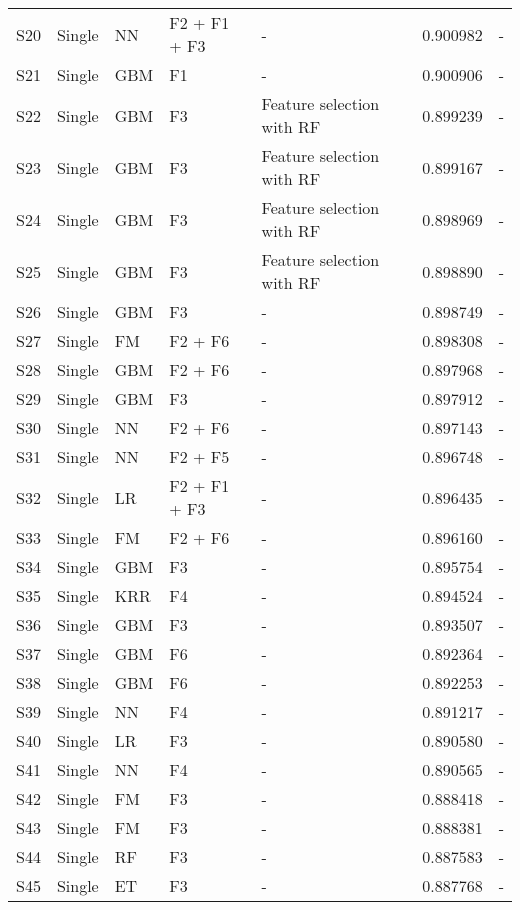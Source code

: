 \begin{table*}[t]
\begin{center}
\begin{minipage}{\textwidth}
{\begin{tabular}{lllllll}
S20 	& Single	& NN		& F2 + F1 + F3 			& - 						& 0.900982	& - \\
S21	& Single 	& GBM		& F1					& - 						& 0.900906	& - \\
S22	& Single	& GBM		& F3					& Feature selection with RF	& 0.899239	& - \\
S23	& Single	& GBM		& F3					& Feature selection with RF	& 0.899167	& - \\
S24	& Single	& GBM		& F3					& Feature selection with RF	& 0.898969	& - \\
S25 	& Single	& GBM		& F3					& Feature selection with RF	& 0.898890	& - \\
S26 	& Single	& GBM		& F3					& - 						& 0.898749	& - \\
S27	& Single	& FM		& F2 + F6				& - 						& 0.898308	& - \\
S28  & Single	& GBM		& F2 + F6				& - 						& 0.897968	& - \\
S29	& Single	& GBM		& F3					& - 						& 0.897912	& - \\
S30	& Single	& NN		& F2 + F6				& - 						& 0.897143	& - \\
S31	& Single	& NN		& F2 + F5				& - 						& 0.896748	& - \\
S32	& Single	& LR			& F2 + F1 + F3			& - 						& 0.896435 	& - \\
S33  & Single	& FM		& F2 + F6				& - 						& 0.896160	& - \\
S34  & Single	& GBM		& F3					& - 						& 0.895754	& - \\
S35	& Single	& KRR		& F4					& - 						& 0.894524	& - \\
S36 	& Single	& GBM		& F3					& - 						& 0.893507	& - \\
S37	& Single	& GBM		& F6					& - 						& 0.892364	& - \\
S38 	& Single	& GBM		& F6					& - 						& 0.892253	& - \\
S39 	& Single	& NN		& F4					& - 						& 0.891217	& - \\
S40	& Single	& LR			& F3					& - 						& 0.890580	& - \\
S41	& Single	& NN		& F4					& - 						& 0.890565	& - \\
S42 	& Single	& FM		& F3					& - 						& 0.888418	& - \\
S43	& Single	& FM		& F3					& - 						& 0.888381	& - \\
S44	& Single	& RF			& F3					& - 						& 0.887583	& - \\
S45	& Single	& ET			& F3					& - 						& 0.887768	& - \\

\end{tabular}}
\end{minipage}
\end{center}
\end{table*}
